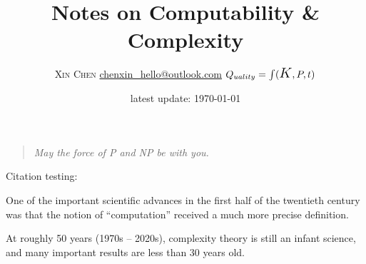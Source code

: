 \documentclass[12pt]{article} %
\title{Notes on Computability \& Complexity}
\author{\textsc{Xin Chen} \qquad \href{mailto:chenxin_hello@outlook.com}{\textsf{chenxin\_hello@outlook.com}}  
	\qquad 
	$Q_{uality} = \int (\text{\Large $K$},P,t)$}
\date{latest update: \today}
\begin{document}
\maketitle

\begin{quotation}
	\itshape May the force of \textsf{P} and \textsf{NP} be with you. 	
\end{quotation}


\tableofcontents


\medskip

Citation testing: \cite{Aro.Bar2009}

\vspace{2em}

One of the important scientific advances in the first half of the twentieth century was that the notion of ``computation'' received a much more precise definition.


At roughly 50 years (1970s -- 2020s), 
complexity theory is still an infant science, 
and many important results are less than 30 years old.










\clearpage
\printbibliography
{}
\end{document}
